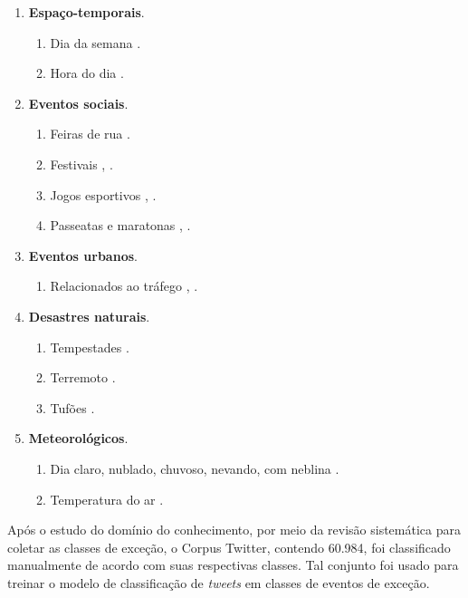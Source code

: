 \documentclass[
	12pt,				%
	oneside,			%
	a4paper,			%
	english,			%
	brazil				%
	]{abntex2ppgsi}
\begin{document}
{{\begin{enumerate}
\item \textbf{Espaço-temporais}.
\begin{enumerate}
\item Dia da semana \cite{Chen2016}.
\item Hora do dia \cite{Chen2016}.
\end{enumerate}

\item \textbf{Eventos sociais}.
\begin{enumerate}
\item Feiras de rua \cite{Chen2016}.
\item Festivais \cite{Chen2016}, \cite{Lecue2014}.
\item Jogos esportivos \cite{Chen2016}, \cite{Gal-Tzur2014}.
\item Passeatas e maratonas \cite{Chen2016}, \cite{Itoh2016}.
\end{enumerate}

\item \textbf{Eventos urbanos}.
\begin{enumerate}
\item Relacionados ao tráfego \cite{Chen2016}, \cite{Lecue2014}.
\end{enumerate}

\item \textbf{Desastres naturais}.
\begin{enumerate}
\item Tempestades \cite{Itoh2016}.
\item Terremoto \cite{Itoh2016}.
\item Tufões \cite{Itoh2016}.
\end{enumerate}

\item \textbf{Meteorológicos}.
\begin{enumerate}
\item Dia claro, nublado, chuvoso, nevando, com neblina \cite{Chen2016}.
\item Temperatura do ar \cite{Chen2016}.
\end{enumerate}
\end{enumerate}

Após o estudo do domínio do conhecimento, por meio da revisão sistemática para coletar as classes de exceção, o Corpus Twitter, contendo 60.984, foi classificado manualmente de acordo com suas respectivas classes. Tal conjunto foi usado para treinar o modelo de classificação de \textit{tweets} em classes de eventos de exceção. 

}}
\end{document}
